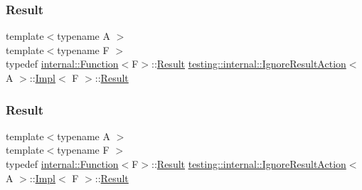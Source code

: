 \mbox{\label{classtesting_1_1internal_1_1_ignore_result_action_1_1_impl_a5848be04a86b1149840d04eca6e0bc80}} 
\subsubsection{\texorpdfstring{Result}{Result}\hspace{0.1cm}{\footnotesize\ttfamily [1/3]}}
{\footnotesize\ttfamily template$<$typename A $>$ \\
template$<$typename F $>$ \\
typedef \mbox{\hyperlink{structtesting_1_1internal_1_1_function}{internal\+::\+Function}}$<$F$>$\+::\mbox{\hyperlink{classtesting_1_1_action_interface_a7477de2fe3e4e01c59db698203acaee7}{Result}} \mbox{\hyperlink{classtesting_1_1internal_1_1_ignore_result_action}{testing\+::internal\+::\+Ignore\+Result\+Action}}$<$ A $>$\+::\mbox{\hyperlink{classtesting_1_1internal_1_1_ignore_result_action_1_1_impl}{Impl}}$<$ F $>$\+::\mbox{\hyperlink{classtesting_1_1_action_interface_a7477de2fe3e4e01c59db698203acaee7}{Result}}}

\mbox{\label{classtesting_1_1internal_1_1_ignore_result_action_1_1_impl_a5848be04a86b1149840d04eca6e0bc80}} 
\subsubsection{\texorpdfstring{Result}{Result}\hspace{0.1cm}{\footnotesize\ttfamily [2/3]}}
{\footnotesize\ttfamily template$<$typename A $>$ \\
template$<$typename F $>$ \\
typedef \mbox{\hyperlink{structtesting_1_1internal_1_1_function}{internal\+::\+Function}}$<$F$>$\+::\mbox{\hyperlink{classtesting_1_1_action_interface_a7477de2fe3e4e01c59db698203acaee7}{Result}} \mbox{\hyperlink{classtesting_1_1internal_1_1_ignore_result_action}{testing\+::internal\+::\+Ignore\+Result\+Action}}$<$ A $>$\+::\mbox{\hyperlink{classtesting_1_1internal_1_1_ignore_result_action_1_1_impl}{Impl}}$<$ F $>$\+::\mbox{\hyperlink{classtesting_1_1_action_interface_a7477de2fe3e4e01c59db698203acaee7}{Result}}}

